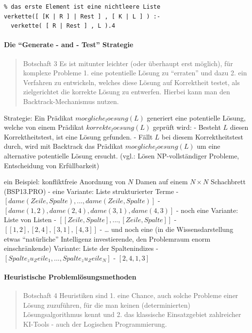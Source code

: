 \documentclass[a4paper]{article}
\begin{document}
\begin{multicols}{3}
\begin{verbatim}
% das erste Element ist eine nichtleere Liste
verkette([ [K | R ] | Rest ] , [ K | L ] ) :-
  verkette( [ R | Rest ] , L ).4
\end{verbatim}

  \paragraph{Die ``Generate - and - Test''
    Strategie}\label{die-generate---and---test-strategie}

  \begin{quote}
    Botschaft 3 Es ist mitunter leichter (oder überhaupt erst möglich), für
    komplexe Probleme 1. eine potentielle Lösung zu ``erraten'' und dazu 2.
    ein Verfahren zu entwickeln, welches diese Lösung auf Korrektheit
    testet, als zielgerichtet die korrekte Lösung zu entwerfen. Hierbei kann
    man den Backtrack-Mechanismus nutzen.
  \end{quote}

  Strategie: Ein Prädikat $moegliche_loesung(L)$ generiert eine
  potentielle Lösung, welche von einem Prädikat $korrekte_loesung(L)$
  geprüft wird: - Besteht $L$ diesen Korrektheitstest, ist eine Lösung
  gefunden. - Fällt $L$ bei diesem Korrektheitstest durch, wird mit
  Backtrack das Prädikat $moegliche_loesung(L)$ um eine alternative
  potentielle Lösung ersucht. (vgl.: Lösen NP-vollständiger Probleme,
  Entscheidung von Erfüllbarkeit)

  ein Beispiel: konfliktfreie Anordnung von $N$ Damen auf einem
  $N\times N$ Schachbrett (BSP13.PRO) - eine Variante: Liste
  strukturierter Terme - $[dame(Zeile,Spalte),...,dame(Zeile,Spalte)]$ -
  $[dame(1,2), dame(2,4), dame(3,1), dame(4,3) ]$ - noch eine Variante:
  Liste von Listen - $[[Zeile, Spalte] , ... , [Zeile,Spalte] ]$ -
  $[ [1,2] , [2,4] , [3,1] , [4,3] ]$ - \ldots{} und noch eine (in die
  Wissensdarstellung etwas ``natürliche'' Intelligenz investierende, den
  Problemraum enorm einschränkende) Variante: Liste der Spaltenindizes -
  $[ Spalte_zu_Zeile_1, ..., Spalte_zu_Zeile_N ]$ - $[ 2, 4, 1, 3 ]$

  \paragraph{Heuristische
    Problemlösungsmethoden}\label{heuristische-problemluxf6sungsmethoden}

  \begin{quote}
    Botschaft 4 Heuristiken sind 1. eine Chance, auch solche Probleme einer
    Lösung zuzuführen, für die man keinen (determinierten)
    Lösungsalgorithmus kennt und 2. das klassische Einsatzgebiet zahlreicher
    KI-Tools - auch der Logischen Programmierung.
  \end{quote}


\end{multicols}
\end{document}
